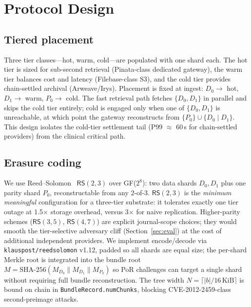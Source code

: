 \section{Protocol Design}
\label{sec:protocol}

\subsection{Tiered placement}
\label{sec:protocol:placement}

Three tier classes---hot, warm, cold---are populated with one shard each. The hot tier is sized for sub-second retrieval (Pinata-class dedicated gateway), the warm tier balances cost and latency (Filebase-class S3), and the cold tier provides chain-settled archival (Arweave/Irys). Placement is fixed at ingest: \(D_0 \to\) hot, \(D_1 \to\) warm, \(P_0 \to\) cold. The fast retrieval path fetches \(\{D_0, D_1\}\) in parallel and skips the cold tier entirely; cold is engaged only when one of \(\{D_0, D_1\}\) is unreachable, at which point the gateway reconstructs from \(\{P_0\} \cup\{D_0 \mid D_1\}\). This design isolates the cold-tier settlement tail (P99 \(\approx\) 60\,s for chain-settled providers) from the clinical critical path.

\subsection{Erasure coding}
\label{sec:protocol:erasure}

We use Reed--Solomon~\cite{plank1997erasure} \(\textsf{RS}(2,3)\) over GF(\(2^8\)): two data shards \(D_0, D_1\) plus one parity shard \(P_0\), reconstructable from any 2-of-3. \(\textsf{RS}(2,3)\) is the \emph{minimum meaningful} configuration for a three-tier substrate: it tolerates exactly one tier outage at 1.5\(\times\) storage overhead, versus 3\(\times\) for naive replication. Higher-parity schemes (\(\textsf{RS}(3,5)\), \(\textsf{RS}(4,7)\)) are explicit journal-scope choices; they would smooth the tier-selective adversary cliff (Section~\ref{sec:eval}) at the cost of additional independent providers. We implement encode/decode via \texttt{klauspost/reedsolomon} v1.12, padded so all shards are equal size; the per-shard Merkle root is integrated into the bundle root \(M = \text{SHA-256}(M_{D_0} \mathbin{\|} M_{D_1} \mathbin{\|} M_{P_0})\) so PoR challenges can target a single shard without requiring full bundle reconstruction. The tree width \(N = \lceil |b| / 16\,\text{KiB} \rceil\) is bound on chain in \texttt{BundleRecord.numChunks}, blocking CVE-2012-2459-class second-preimage attacks.

